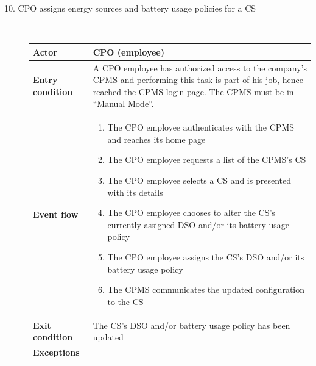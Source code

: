 \documentclass[11pt]{article}
\begin{document}
\begin{description}
    \item [10. CPO assigns energy sources and battery usage policies for a CS] \hfill \\
    \begin{table}[H]
        \centering
        \setlength{\tabcolsep}{18pt}
        \renewcommand{\arraystretch}{1.4}
        \begin{tabularx}{\textwidth}{|>{\hsize=0.5\hsize}X|>{\hsize=1.5\hsize}X|}
            \hline
            \textbf{Actor} & CPO (employee) \\
            \hline
            \textbf{Entry condition} & A CPO employee has authorized access to the company's CPMS and performing this task is part of his job, hence reached the CPMS login page. The CPMS must be in “Manual Mode”. \\
            \hline
            \textbf{Event flow} & 
                \begin{minipage}[t]{\hsize}
                \begin{enumerate}[topsep=0pt, leftmargin=*]
                    \item The CPO employee authenticates with the CPMS and reaches its home page
                    \item The CPO employee requests a list of the CPMS's CS
                    \item The CPO employee selects a CS and is presented with its details
                    \item The CPO employee chooses to alter the CS's currently assigned DSO and/or its battery usage policy
                    \item The CPO employee assigns the CS's DSO and/or its battery usage policy
                    \item The CPMS communicates the updated configuration to the CS
                \end{enumerate}
                \end{minipage}
                \vspace{6pt}
            \\
            \hline
            \textbf{Exit condition} & The CS's DSO and/or battery usage policy has been updated \\
            \hline
            \textbf{Exceptions} & 
                \begin{minipage}[t]{\hsize}

\end{minipage}
\end{tabularx}
\end{table}
\end{description}
\end{document}
